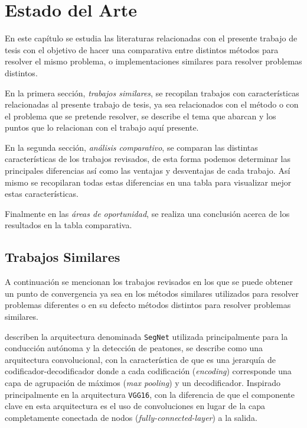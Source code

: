 \chapter{Estado del Arte}
En este capítulo se estudia las literaturas relacionadas con el presente trabajo de tesis con el objetivo de hacer una comparativa entre distintos métodos para resolver el mismo problema, o implementaciones similares para resolver problemas distintos.

En la primera sección, \emph{trabajos similares}, se recopilan trabajos con características relacionadas al presente trabajo de tesis, ya sea relacionados con el método o con el problema que se pretende resolver, se describe el tema que abarcan y los puntos que lo relacionan con el trabajo aquí presente.

En la segunda sección, \emph{análisis comparativo}, se comparan las distintas características de los trabajos revisados, de esta forma podemos determinar las principales diferencias así como las ventajas y desventajas de cada trabajo. Así mismo se recopilaran todas estas diferencias en una tabla para visualizar mejor estas características.

Finalmente en las \emph{áreas de oportunidad}, se realiza una conclusión acerca de los resultados en la tabla comparativa.

\section{Trabajos Similares}

A continuación se mencionan los trabajos revisados en los que se puede obtener un punto de convergencia ya sea en los métodos similares utilizados para resolver problemas diferentes o en su defecto métodos distintos para resolver problemas similares.

\citet{DBLP:journals/corr/BadrinarayananK15} describen la arquitectura denominada \texttt{SegNet} utilizada principalmente para la conducción autónoma y la detección de peatones, se describe como una arquitectura convolucional, con la característica de que es una jerarquía de codificador-decodificador donde a cada codificación (\emph{encoding}) corresponde una capa de agrupación de máximos (\emph{max pooling}) y un decodificador. Inspirado principalmente en la arquitectura \texttt{VGG16}, con la diferencia de que el componente clave en esta arquitectura es el uso de convoluciones en lugar de la capa completamente conectada de nodos (\emph{fully-connected-layer}) a la salida.

